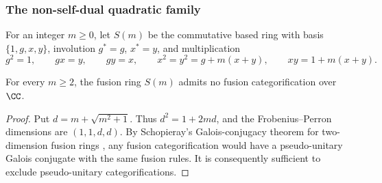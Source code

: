 \subsubsection{The non-self-dual quadratic family}

For an integer $m\geq0$, let $S(m)$ be the commutative based ring with basis
$\{1,g,x,y\}$, involution $g^*=g$, $x^*=y$, and multiplication
\[
 g^2=1,\qquad gx=y,\qquad gy=x,\qquad
 x^2=y^2=g+m(x+y),\qquad xy=1+m(x+y).
\]

\begin{theorem}\label{finite:thm:nonselfdual-quadratic}
For every $m\geq2$, the fusion ring $S(m)$ admits no fusion categorification
over $\CC$.
\end{theorem}

\begin{proof}
Put $d=m+\sqrt{m^2+1}$. Thus $d^2=1+2md$, and the Frobenius--Perron
dimensions are $(1,1,d,d)$. By Schopieray's Galois-conjugacy theorem for
two-dimension fusion rings \cite[Lemma~3.1]{Schopieray}, any fusion
categorification would have a pseudo-unitary Galois conjugate with the same
fusion rules. It is consequently sufficient to exclude pseudo-unitary
categorifications.


\end{proof}
